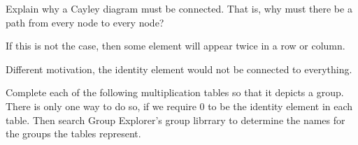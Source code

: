 \documentclass[11pt]{exam}
\begin{document}
\begin{questions}
	\question Explain why a Cayley diagram must be connected. That is, why must there be a path from every node to every node?
	\begin{solution}
		\par If this is not the case, then some element will appear twice in a row or column.
		\par Different motivation, the identity element would not be connected to everything.
	\end{solution}
	
	\question Complete each of the following multiplication tables so that it depicts a group. There is only one way to do so, if we require $0$ to be the identity element in each table. Then search Group Explorer's group librrary to determine the names for the groups the tables represent.
	\begin{solution}
\end{solution}
\end{questions}
\end{document}
